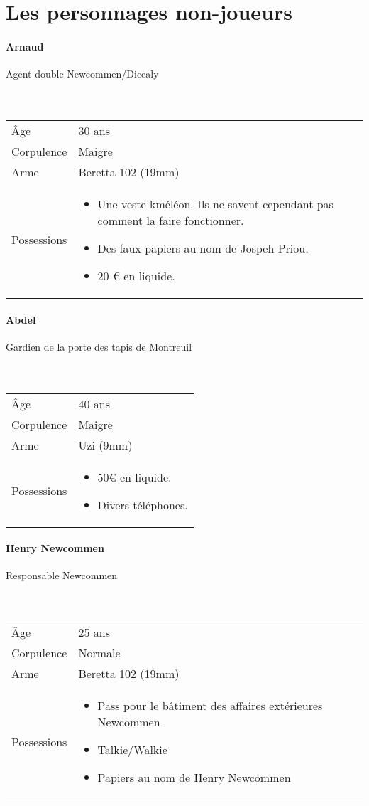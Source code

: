 \documentclass[10pt,a4paper,twocolumn]{article}
\begin{document}
\section*{Les personnages non-joueurs}
\hypertarget{arnaud}{\paragraph{Arnaud}} Agent double Newcommen/Dicealy\\ \\
\
\begin{tabular}{l|p{}}
	Âge & 30 ans\\
	Corpulence & Maigre \\
	Arme & Beretta 102 (19mm) \\
	Possessions & \begin{itemize}
	\item Une veste kméléon. Ils ne savent cependant pas comment la faire fonctionner.
	\item Des faux papiers au nom de Jospeh Priou.
	\item 20 € en liquide.
\end{itemize} \\
\end{tabular}
\hypertarget{abdel}{\paragraph{Abdel}} Gardien de la porte des tapis de Montreuil\\ \\
\
\begin{tabular}{l|p{0.3\textwidth}}
	Âge & 40 ans\\
	Corpulence & Maigre \\
	Arme & Uzi (9mm) \\
	Possessions & \begin{itemize}
	\item 50€ en liquide.
	\item Divers téléphones.
\end{itemize}	 \\
\end{tabular}

\hypertarget{henry}{\paragraph{Henry Newcommen}}Responsable Newcommen\\ \\
\
\begin{tabular}{l|p{}}
	Âge & 25 ans\\
	Corpulence & Normale \\
	Arme & Beretta 102 (19mm) \\
	Possessions & \begin{itemize}
	\item Pass pour le bâtiment des affaires extérieures Newcommen
	\item Talkie/Walkie
	\item Papiers au nom de Henry Newcommen
\end{itemize}	 \\
\end{tabular}
\end{document}
